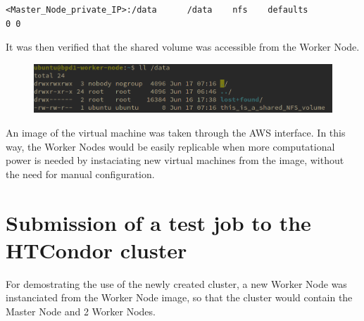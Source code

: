 \documentclass{article}
\begin{document}
\begin{lstlisting}
<Master_Node_private_IP>:/data      /data    nfs    defaults                0 0
\end{lstlisting}

It was then verified that the shared volume was accessible from the Worker Node.

\begin{figure}[!h]
	\center
	\includegraphics[width=\textwidth]{./images/nfs_works.png}
\end{figure}

An image of the virtual machine was taken through the AWS interface.
In this way, the Worker Nodes would be easily replicable when more computational power is needed by instaciating new virtual machines from the image, without the need for manual configuration.

\section{Submission of a test job to the HTCondor cluster}
For demostrating the use of the newly created cluster, a new Worker Node was instanciated from the Worker Node image, so that the cluster would contain the Master Node and 2 Worker Nodes.
\end{document}
